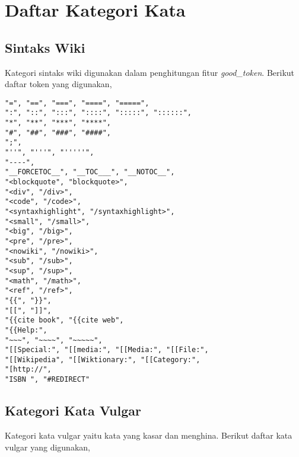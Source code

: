 \newpage
\section{Daftar Kategori Kata}
\label{appendix:daftar_kategori_kata}

\subsection{Sintaks Wiki}
\label{appendix:words_wiki_token}

Kategori sintaks wiki digunakan dalam penghitungan fitur \textit{good\_token}.
Berikut daftar token yang digunakan,

\begin{lstlisting}
"=", "==", "===", "====", "=====",
":", "::", ":::", "::::", ":::::", "::::::",
"*", "**", "***", "****",
"#", "##", "###", "####",
";",
"''", "'''", "'''''",
"----",
"__FORCETOC__", "__TOC___", "__NOTOC__",
"<blockquote", "blockquote>",
"<div", "/div>",
"<code", "/code>",
"<syntaxhighlight", "/syntaxhighlight>",
"<small", "/small>",
"<big", "/big>",
"<pre", "/pre>",
"<nowiki", "/nowiki>",
"<sub", "/sub>",
"<sup", "/sup>",
"<math", "/math>",
"<ref", "/ref>",
"{{", "}}",
"[[", "]]",
"{{cite book", "{{cite web",
"{{Help:",
"~~~", "~~~~", "~~~~~",
"[[Special:", "[[media:", "[[Media:", "[[File:",
"[[Wikipedia", "[[Wiktionary:", "[[Category:",
"[http://",
"ISBN ", "#REDIRECT"
\end{lstlisting}

\subsection{Kategori Kata Vulgar}
\label{appendix:words_vulgar}

Kategori kata vulgar yaitu kata yang kasar dan menghina.
Berikut daftar kata vulgar yang digunakan,

